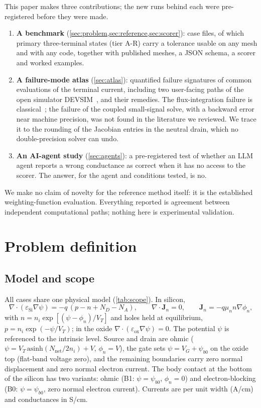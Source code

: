 \documentclass[11pt]{article}
\begin{document}
This paper makes three contributions; the new runs behind each were pre-registered before they were made.
\begin{enumerate}
\item \textbf{A benchmark} (\cref{sec:problem,sec:reference,sec:scorer}): \nCasesTotal{} case files, of which
\nAR{} primary three-terminal states (tier A-R) carry a tolerance usable on any mesh and with any code, together
with published meshes, a JSON schema, a scorer and worked examples.
\item \textbf{A failure-mode atlas} (\cref{sec:atlas}): quantified failure signatures of common evaluations of the
terminal current, including two user-facing paths of the open simulator DEVSIM~\cite{Sanchez2022,DEVSIMManual}, and
their remedies. The flux-integration failure is classical~\cite{PalmVandeWiele1985}; the failure of the coupled
small-signal solve, with a backward error near machine precision, was not found in the literature we reviewed. We trace
it to the rounding of the Jacobian entries in the neutral drain, which no double-precision solver can undo.
\item \textbf{An AI-agent study} (\cref{sec:agents}): a pre-registered test of whether an LLM agent reports a wrong
conductance as correct when it has no access to the scorer. The answer, for the agent and conditions tested, is no.
\end{enumerate}
We make no claim of novelty for the reference method itself: it is the established weighting-function evaluation.
Everything reported is agreement between independent computational paths; nothing here is experimental validation.

\section{Problem definition}\label{sec:problem}

\subsection{Model and scope}
All cases share one physical model (\cref{tab:scope}). In silicon,
\begin{equation}
\nabla\cdot(\varepsilon_\mathrm{Si}\nabla\psi) = -q\,(p - n + N_D - N_A), \qquad
\nabla\cdot\mathbf{J}_n = 0, \qquad \mathbf{J}_n = -q\mu_n n\nabla\phi_n,
\label{eq:dd}
\end{equation}
with $n = n_i\exp[(\psi-\phi_n)/V_T]$ and holes held at equilibrium, $p = n_i\exp(-\psi/V_T)$; in the oxide
$\nabla\cdot(\varepsilon_\mathrm{ox}\nabla\psi) = 0$. The potential $\psi$ is referenced to the intrinsic level.
Source and drain are ohmic ($\psi = V_T\,\mathrm{asinh}(N_\mathrm{net}/2n_i) + V$, $\phi_n = V$), the gate sets
$\psi = V_G + \psi_{b0}$ on the oxide top (flat-band voltage zero), and the remaining boundaries carry zero normal
displacement and zero normal electron current. The body contact at the bottom of the silicon has two variants: ohmic
(B1: $\psi = \psi_{b0}$, $\phi_n = 0$) and electron-blocking (B0: $\psi = \psi_{b0}$, zero normal electron current).
Currents are per unit width (A/cm) and conductances in S/cm.
\end{document}
